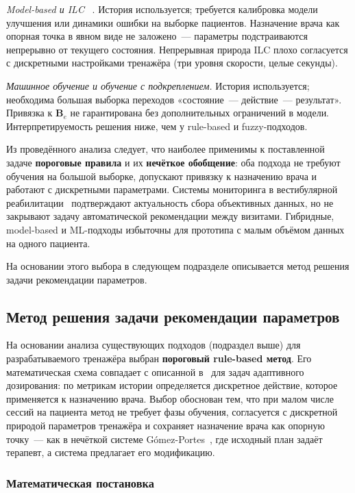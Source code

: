 \textit{Model-based и ILC}
~\cite{noble2021,mi2020}.
История используется; требуется калибровка модели улучшения или
динамики ошибки на выборке пациентов. Назначение врача как опорная
точка в явном виде не заложено~--- параметры подстраиваются
непрерывно от текущего состояния. Непрерывная природа ILC
плохо согласуется с дискретными настройками тренажёра (три
уровня скорости, целые секунды).

\textit{Машинное обучение и обучение с подкреплением.}
История используется; необходима большая выборка переходов
«состояние~--- действие~--- результат». Привязка к $\mathbf{B}_e$
не гарантирована без дополнительных ограничений в модели.
Интерпретируемость решения ниже, чем у rule-based и fuzzy-подходов.

Из проведённого анализа следует, что наиболее применимы к поставленной
задаче \textbf{пороговые правила} и их \textbf{нечёткое обобщение}:
оба подхода не требуют обучения на большой выборке, допускают привязку
к назначению врача и работают с дискретными параметрами. Системы
мониторинга в вестибулярной реабилитации~\cite{hovareshti2021,meldrum2022}
подтверждают актуальность сбора объективных данных, но не закрывают
задачу автоматической рекомендации между визитами. Гибридные,
model-based и ML-подходы избыточны для прототипа с малым объёмом
данных на одного пациента.

На основании этого выбора в следующем подразделе описывается
метод решения задачи рекомендации параметров.

\subsection{Метод решения задачи рекомендации параметров}

На основании анализа существующих подходов (подраздел выше) для
разрабатываемого тренажёра выбран \textbf{пороговый rule-based метод}.
Его математическая схема совпадает с описанной в~\cite{noble2021,gomez2021}
для задач адаптивного дозирования: по метрикам истории определяется
дискретное действие, которое применяется к назначению врача. Выбор
обоснован тем, что при малом числе сессий на пациента метод не требует
фазы обучения, согласуется с дискретной природой параметров тренажёра
и сохраняет назначение врача как опорную точку~--- как в нечёткой
системе G\'{o}mez-Portes~\cite{gomez2021}, где исходный план задаёт
терапевт, а система предлагает его модификацию.

\subsubsection{Математическая постановка}

